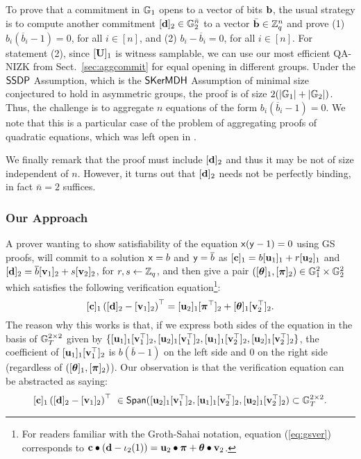 To prove that a commitment in $\mathbb{G}_1$ opens to a vector of bits $\mathbf{b}$, the usual strategy is to compute another commitment $[\mathbf{d}]_2\in\mathbb{G}_2^{\bar{n}}$ to a vector $\bar{\mathbf{b}}\in\mathbb{Z}_q^n$ and prove 
  (1) $b_i(\overline{b}_i-1)=0$, for all $i \in [n]$, and 
  (2) $b_i-\overline{b}_i=0$, for all $i \in [n]$. 
For statement  (2), since $[\mathbf{{U}}]_1$ is witness samplable, we can use our most efficient QA-NIZK from Sect.\ \ref{sec:aggcommit} for equal opening in different groups.  Under the $\mathsf{SSDP}$ Assumption, which is the $\mathsf{SKerMDH}$ Assumption of minimal size conjectured to hold in asymmetric groups, the proof is of size $2(|\mathbb{G}_1|+|\mathbb{G}_2|)$. Thus, the challenge is to aggregate $n$ equations of the form $b_i(\overline{b}_i-1)=0$. We note that this is a particular case of the problem of aggregating proofs of quadratic equations, which was left open in \cite{C:JutRoy14}.

We finally remark that the proof must include $[\mathbf{d}]_2$ and thus it may be not of size independent of $n$. However, it turns out that $[\mathbf{d}]_2$ needs not be perfectly binding, in fact $\bar{n}=2$ suffices.

\subsubsection{Our Approach}

A prover wanting to show satisfiability of the equation  $\mathsf{x}(\mathsf{y}-1)=0$ using GS proofs, will commit to a solution  
$\mathsf{x}=b$ and $\mathsf{y}=\overline{b}$ as $[\mathbf{c}]_1=b [\mathbf{u}_1]_1 + r [\mathbf{u}_2]_1$ and 
 $[\mathbf{d}]_2=\overline{b} [\mathbf{v}_1]_2 + s [\mathbf{v}_2]_2$, for $r,s \leftarrow \mathbb{Z}_q$, and then give a pair $([{\boldsymbol \theta}]_1,[{\boldsymbol \pi}]_2)
\in \mathbb{G}_1^{2} \times \mathbb{G}_2^{2}$ which satisfies the following verification equation\footnote{For readers familiar with the Groth-Sahai notation, equation (\ref{eq:gsver}) corresponds to 
$\mathbf{c} \bullet \left(\mathbf{d}-\iota_2(1)\right) = \mathbf{u}_2 \bullet {\boldsymbol \pi} + {\boldsymbol \theta} \bullet \mathbf{v}_2$.}:
\begin{equation} \label{eq:gsver}
[\mathbf{c}]_1 \left([\mathbf{d}]_2-
 [{\mathbf{v}}_1]_2\right)^{\top}=[{\mathbf{u}}_2]_1  
[{\boldsymbol \pi}^{\top}]_2+ [{\boldsymbol \theta}]_1   [\mathbf{v}_2^{\top}]_2. 
\end{equation}
The reason why this works is that, if we express both sides of the equation in the basis of 
$\mathbb{G}_T^{2\times 2}$ given by 
$\{[\mathbf{u}_1]_1[\mathbf{v}_1^\top]_2,[\mathbf{u}_2]_1[\mathbf{v}_1^\top]_2,[\mathbf{u}_1]_1[\mathbf{v}_2^\top]_2,[\mathbf{u}_2]_1[\mathbf{v}_2^\top]_2\}$, the coefficient of 
$[\mathbf{u}_1]_1[\mathbf{v}_1^\top]_2$ is $b(\overline{b}-1)$ on the left side and $0$ on the right side (regardless of
$([{\boldsymbol \theta}]_1,[{\boldsymbol \pi}]_2)$).
Our observation is that the verification equation can be abstracted as saying:
\begin{equation}\label{eq:gsabstracted}
[\mathbf{c}]_1 \left([\mathbf{d}]_2-[\mathbf{v}_1]_2\right)^{\top} \ \in \mathsf{Span}([\mathbf{u}_2]_1[\mathbf{v}_1^\top]_2,[\mathbf{u}_1]_1[\mathbf{v}_2^\top]_2,[\mathbf{u}_2]_1[\mathbf{v}_2^\top]_2) \subset  \mathbb{G}_T^{2 \times 2}. 
\end{equation}

